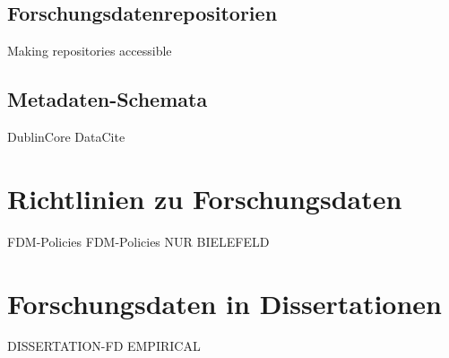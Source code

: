 \subsection{Forschungsdatenrepositorien}\label{sec:forschungsstand-basics-repositories}
Making repositories accessible \autocite{Pampel2013}

\subsection{Metadaten-Schemata}\label{sec:forschungsstand-basics-metadata}
DublinCore DataCite \autocite{datacite}


\section{Richtlinien zu Forschungsdaten}\label{sec:forschungsstand-guidelines}
FDM-Policies \autocite{Briney2015-Policy,Hiemenz2018-fdm-report,Hiemenz2018-fdm-title}
FDM-Policies NUR BIELEFELD \autocite{hrk-fdm}



\section{Forschungsdaten in Dissertationen}\label{sec:forschungsstand-diss}
DISSERTATION-FD EMPIRICAL \autocite{Campbell2019}
\autocite{Weisbrod2017eDissPlus,Weisbrod2018,dnb2017}
\autocite{Wünsche2018Forschungsdaten}
\autocite{Schöpfel2015}







